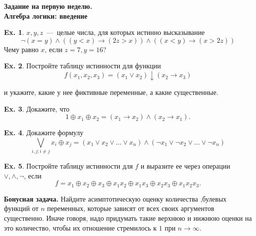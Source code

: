 \documentclass[12pt,a5paper,fleqn]{article}
\theoremstyle{definition}
\newtheorem{Def}{Def.}
\newtheorem{Ex}{Ex.}
\begin{document}
\newpage

\setcounter{Ex}{0}

\begin{center}
	{\bf \Large Задание на первую неделю. \\ \normalsize Алгебра логики: введение}
\end{center}
\vspace{0.6cm}

%

\begin{Ex}
	$x,y,z$~---~целые числа, для которых истинно высказывание
$$
	\neg(x=y)\wedge ((y<x)\to(2z>x))\wedge((x<y)\to(x>2z))
$$
	Чему равно $x$, если $z=7,y=16$?
\end{Ex}

\begin{Ex}
	Постройте таблицу истинности для функции
$$
	f(x_1, x_2, x_3) = (x_1 \vee x_2) \downarrow (x_2\to x_3)
$$
	
	и укажите, какие у нее фиктивные переменные, а какие существенные.
\end{Ex}

\begin{Ex}
	Докажите, что
$$
	1 \oplus x_1 \oplus x_2 = (x_1\to x_2)\wedge(x_2\to x_1).
$$
\end{Ex}

\begin{Ex}
	Докажите формулу
$$
	\bigvee_{i,j; i\neq j} x_i \oplus x_j =(x_1\vee x_2\vee\ldots\vee x_n)
	\wedge (\neg x_1\vee\neg x_2\vee\ldots\vee \neg x_n)
$$
\end{Ex}

\begin{Ex}
	Постройте таблицу истинности для $f$ и выразите ее через операции
	$\vee, \wedge, \neg$, если
$$
	f = x_1 \oplus x_2 \oplus x_3 \oplus x_1x_2 \oplus x_1x_3
	\oplus x_2x_3 \oplus x_1x_2x_3.
$$
\end{Ex}

\textbf{Бонусная задача.} Найдите асимптотическую оценку количества ,булевых 
функций от $n$ переменных, которые зависят от всех своих аргументов существенно. 
Иначе говоря, надо придумать такие верхнюю и нижнюю оценки на это количество, 
чтобы их отношение стремилось к $1$ при $n\to\infty$.
\end{document}
